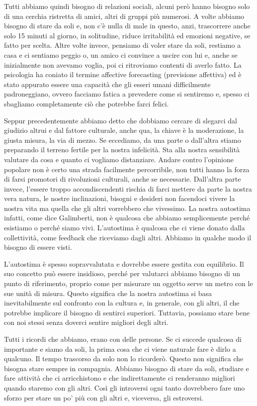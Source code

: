\documentclass[12pt]{book} %
\begin{document}
Tutti abbiamo quindi bisogno di relazioni sociali, alcuni però hanno bisogno solo di una cerchia ristretta di amici,
altri di gruppi più numerosi. A volte abbiamo bisogno di stare da
soli e, non c'è nulla di male in questo, anzi, trascorrere anche solo
15 minuti al giorno, in solitudine, riduce irritabilità ed emozioni negative, se fatto per scelta. Altre volte invece,
pensiamo di voler stare da soli, restiamo a casa e ci sentiamo peggio o, un amico ci convince a uscire con lui e, anche
se inizialmente non avevamo voglia, poi ci ritroviamo contenti di averlo fatto. La psicologia ha coniato il termine affective
forecasting (previsione affettiva) ed è stato appurato essere una capacità che gli esseri umani difficilmente
padroneggiano, ovvero facciamo fatica a prevedere come si sentiremo e, spesso ci sbagliamo completamente ciò che
potrebbe farci felici.

Seppur precedentemente abbiamo detto che dobbiamo cercare di slegarci dal giudizio altrui e dal fattore culturale, anche
qua, la chiave è la moderazione, la giusta misura, la via di mezzo. Se eccediamo, da una parte o
dall'altra stiamo preparando il terreno fertile per la nostra infelicità. Sta alla nostra
sensibilità valutare da cosa e quanto ci vogliamo distanziare. Andare contro l'opinione popolare non è
certo una strada facilmente percorribile, non tutti hanno la forza di farsi promotori di rivoluzioni culturali, anche
se necessarie. Dall'altra parte invece, l'essere troppo accondiscendenti
rischia di farci mettere da parte la nostra vera natura, le nostre inclinazioni, bisogni e desideri non facendoci
vivere la nostra vita ma quella che gli altri vorrebbero che vivessimo. La nostra autostima infatti, come dice
Galimberti, non è qualcosa che abbiamo semplicemente perché esistiamo o perché siamo vivi.
L'autostima è qualcosa che ci viene donato dalla collettività, come feedback che riceviamo dagli
altri. Abbiamo in qualche modo il bisogno di essere visti.

L'autostima è spesso sopravvalutata e dovrebbe essere gestita con equilibrio. Il suo concetto può essere insidioso, perché per valutarci abbiamo bisogno di un punto di riferimento, proprio come per misurare un oggetto serve un metro con le sue unità di misura. Questo significa che la nostra autostima si basa inevitabilmente sul confronto con la cultura e, in generale, con gli altri, il che potrebbe implicare il bisogno di sentirci superiori.
Tuttavia, possiamo stare bene con noi stessi senza doverci sentire migliori degli altri.

Tutti i ricordi che abbiamo, erano con delle persone. Se ci succede qualcosa di importante e siamo da soli, la prima cosa che ci viene naturale fare è dirlo a qualcuno. Il tempo trascorso da solo non lo ricorderò. Questo non significa che bisogna stare sempre in compagnia. Abbiamo bisogno di stare da soli, studiare e fare attività che ci arricchistono e che indirettamente ci renderanno migliori quando staremo con gli altri. Così gli introversi ogni tanto dovrebbero fare uno sforzo per stare  un po' più con gli altri e, viceversa, gli estroversi.
\end{document}
